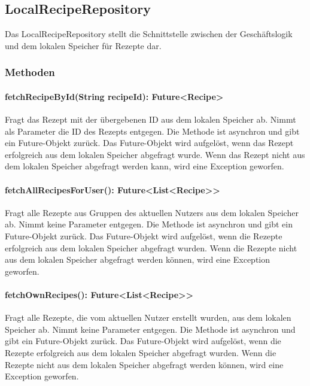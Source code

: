 \documentclass[parskip=full]{scrartcl}
\begin{document}
\subsection{LocalRecipeRepository}
Das LocalRecipeRepository stellt die Schnittstelle zwischen der Geschäftslogik und dem lokalen Speicher für Rezepte dar.
\subsubsection{Methoden}
\paragraph{fetchRecipeById(String recipeId): Future<Recipe>}
Fragt das Rezept mit der übergebenen ID aus dem lokalen Speicher ab. Nimmt als Parameter die ID des Rezepts entgegen. Die Methode ist asynchron und gibt ein Future-Objekt zurück. Das Future-Objekt wird aufgelöst, wenn das Rezept erfolgreich aus dem lokalen Speicher abgefragt wurde. Wenn das Rezept nicht aus dem lokalen Speicher abgefragt werden kann, wird eine Exception geworfen.
\paragraph{fetchAllRecipesForUser(): Future<List<Recipe>>}
Fragt alle Rezepte aus Gruppen des aktuellen Nutzers aus dem lokalen Speicher ab. Nimmt keine Parameter entgegen. Die Methode ist asynchron und gibt ein Future-Objekt zurück. Das Future-Objekt wird aufgelöst, wenn die Rezepte erfolgreich aus dem lokalen Speicher abgefragt wurden. Wenn die Rezepte nicht aus dem lokalen Speicher abgefragt werden können, wird eine Exception geworfen.
\paragraph{fetchOwnRecipes(): Future<List<Recipe>>}
Fragt alle Rezepte, die vom aktuellen Nutzer erstellt wurden, aus dem lokalen Speicher ab. Nimmt keine Parameter entgegen. Die Methode ist asynchron und gibt ein Future-Objekt zurück. Das Future-Objekt wird aufgelöst, wenn die Rezepte erfolgreich aus dem lokalen Speicher abgefragt wurden. Wenn die Rezepte nicht aus dem lokalen Speicher abgefragt werden können, wird eine Exception geworfen.
\end{document}

